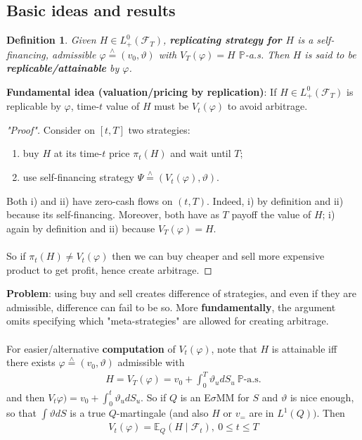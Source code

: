\documentclass[12pt,a4paper, twoside]{article}
\newtheorem{defn}{Definition}[section]
\theoremstyle{definition}
\newcommand{\EE}{\mathbb{E}} %
\newcommand{\PP}{\mathbb{P}} %
\newcommand{\teq}{\overset{\wedge}{=}}
\begin{document}
\subsection{Basic ideas and results}
\begin{defn} Given $H \in L_+^0( \mathcal{F}_T)$, \textbf{replicating strategy for $H$} is a self-financing, admissible $\varphi \teq ( v_0, \vartheta)$ with $V_T( \varphi)=H$ $\PP$-a.s. Then $H$ is said to be \textbf{replicable/attainable} by $\varphi$.
\end{defn}
\noindent \textbf{Fundamental idea (valuation/pricing by replication)}: If $H \in L_+^0( \mathcal{F}_T)$ is replicable by $\varphi$, time-$t$ value of $H$ must be $V_t( \varphi)$ to avoid arbitrage.
\begin{proof}["Proof"] Consider on $[t,T]$ two strategies:
\begin{enumerate}
\item buy $H$ at its time-$t$ price $\pi_t(H)$ and wait until $T$; 
\item use self-financing strategy $\Psi \teq ( V_t( \varphi) , \vartheta)$. 
\end{enumerate}
Both i) and ii) have zero-cash flows on $(t,T)$. Indeed, i) by definition and ii) because its self-financing. Moreover, both have as $T$ payoff the value of $H$; i) again by definition and ii) because $V_T( \varphi)=H$. \\
\\
So if $\pi_t(H) \neq V_t( \varphi)$ then we can buy cheaper and sell more expensive product to get profit, hence create arbitrage. 
\end{proof}
\noindent \textbf{Problem}: using buy and sell creates difference of strategies, and even if they are admissible, difference can fail to be so. More \textbf{fundamentally}, the argument omits specifying which "meta-strategies" are allowed for creating arbitrage.\\
\\
For easier/alternative \textbf{computation} of $V_t( \varphi)$, note that $H$ is attainable iff there exists $\varphi \teq ( v_0, \vartheta)$ admissible with 
\begin{align*}
H= V_T( \varphi)= v_0 + \int_0^T \vartheta_u dS_u \ \PP\text{-a.s.}
\end{align*}
and then $V_t \varphi) = v_0 + \int_0^t \vartheta_u dS_u.$ So if $Q$ is an E$\sigma$MM for $S$ and $\vartheta$ is nice enough, so that $\int \vartheta dS$ is a true $Q$-martingale (and also $H$ or $v_=$ are in $L^1(Q))$. Then 
\begin{align} \label{eq61}
V_t( \varphi)= \EE_Q( H \mid \mathcal{F}_t), \ 0 \leq t \leq T \tag{7.1}
\end{align}
\end{document}
